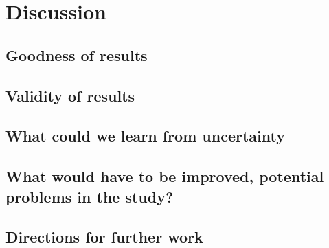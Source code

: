 \chapter{Discussion}
\label{chapter:discussion}

\section{Goodness of results}
\section{Validity of results}
\section{What could we learn from uncertainty}
\section{What would have to be improved, potential problems in the study?}
\section{Directions for further work}
